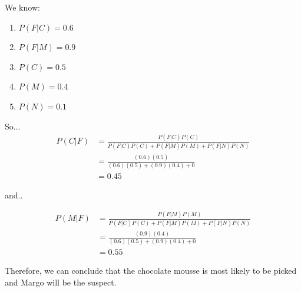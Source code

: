 \begin{enumerate}
    We know:
    \begin{enumerate}
      \item \(P(F|C) = 0.6\)
      \item \(P(F|M) = 0.9\)
      \item \(P(C) = 0.5\)
      \item \(P(M) = 0.4\)
      \item \(P(N) = 0.1\)
    \end{enumerate}

    So...
    \[
      \begin{aligned}
        P(C | F) &= \frac{P(F|C) P(C)}{P(F|C)P(C)+P(F|M)P(M)+P(F|N)P(N)} \\
        &= \frac{(0.6)(0.5)}{(0.6)(0.5)+(0.9)(0.4)+0} \\
        &= \boxed{0.45}
      \end{aligned}
    \]

    and..

    \[
      \begin{aligned}
        P(M|F) &= \frac{P(F|M)P(M)}{P(F|C)P(C)+P(F|M)P(M)+P(F|N)P(N)} \\
        &= \frac{(0.9)(0.4)}{(0.6)(0.5) + (0.9)(0.4) + 0} \\
        &= \boxed{0.55}
      \end{aligned}
    \]

    Therefore, we can conclude that the chocolate mousse is most
    likely to be picked and Margo will be the suspect.
\end{enumerate}
